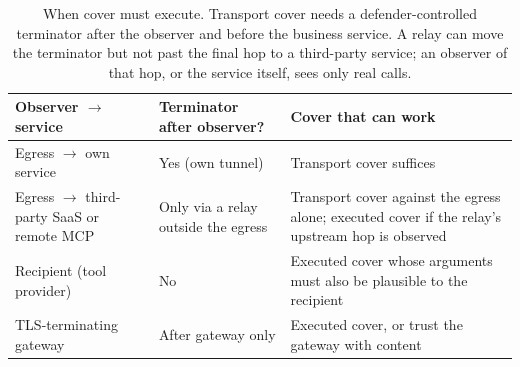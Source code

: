 \begin{table}[t]\centering\footnotesize
\caption{When cover must execute. Transport cover needs a defender-controlled terminator after the observer and before the business service. A relay can move the terminator but not past the final hop to a third-party service; an observer of that hop, or the service itself, sees only real calls.}\label{tab:cover-necessity}
\setlength{\tabcolsep}{3pt}
\begin{tabularx}{\columnwidth}{@{}P{.27\columnwidth}P{.2\columnwidth}Y@{}}\toprule
Observer $\to$ service & Terminator after observer? & Cover that can work \\\midrule
Egress $\to$ own service & Yes (own tunnel) & Transport cover suffices~\cite{apthorpe2019stp} \\\addlinespace[2pt]
Egress $\to$ third-party SaaS or remote MCP & Only via a relay outside the egress & Transport cover against the egress alone; executed cover if the relay's upstream hop is observed \\\addlinespace[2pt]
Recipient (tool provider) & No & Executed cover whose arguments must also be plausible to the recipient \\\addlinespace[2pt]
TLS-terminating gateway & After gateway only & Executed cover, or trust the gateway with content \\\bottomrule
\end{tabularx}\end{table}
